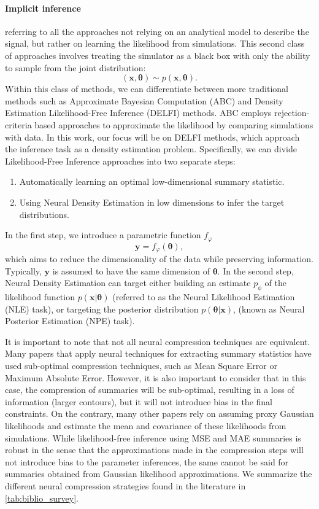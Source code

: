 \documentclass{aa}
\begin{document}
\paragraph{\textbf{Implicit inference}} referring to all the approaches not relying on an analytical model to describe the signal, but rather on learning the likelihood from simulations. This second class of approaches involves treating the simulator as a black box with only the ability to sample from the joint distribution:
\begin{equation}
    (\bm{x}, \bm{\theta})\sim p(\bm{x}, \bm{\theta}).
\end{equation}
Within this class of methods, we can differentiate between more traditional methods such as Approximate Bayesian Computation (ABC) and Density Estimation Likelihood-Free Inference (DELFI) methods. ABC employs rejection-criteria based approaches to approximate the likelihood by comparing simulations with data. 
In this work, our focus will be on DELFI methods, which approach the inference task as a density estimation problem. Specifically, we can divide Likelihood-Free Inference approaches into two separate steps:
\begin{enumerate}
    \item  Automatically learning an optimal low-dimensional summary statistic.
    \item Using Neural Density Estimation in low dimensions to infer the target distributions.
\end{enumerate}
In the first step, we introduce a parametric function $f_{\varphi}$
     \begin{equation}
         \bm{y}=f_{\varphi}(\bm{\theta}),
     \end{equation}
which aims to reduce the dimensionality of the data while preserving information. Typically, $\bm{y}$ is assumed to have the same dimension of $\bm{\theta}$. 
In the second step, Neural Density Estimation can target either building an estimate $p_{\phi}$ of the likelihood function $p(\bm{x}|\bm{\theta})$ (referred to as the Neural Likelihood Estimation (NLE) task), or targeting the posterior distribution $p(\bm{\theta}|\bm{x})$, (known as Neural Posterior Estimation (NPE) task). 

It is important to note that not all neural compression techniques are equivalent. Many papers that apply neural techniques for extracting summary statistics have used sub-optimal compression techniques, such as Mean Square Error or Maximum Absolute Error.
However, it is also important to consider that in this case, the compression of summaries will be sub-optimal, resulting in a loss of information (larger contours), but it will not introduce bias in the final constraints. On the contrary, many other papers rely on assuming proxy Gaussian likelihoods and estimate the mean and covariance of these likelihoods from simulations. While likelihood-free inference using MSE and MAE summaries is robust in the sense that the approximations made in the compression steps will not introduce bias to the parameter inferences, the same cannot be said for summaries obtained from Gaussian likelihood approximations.
We summarize the different neural compression strategies found in the literature in \autoref{tab:biblio_survey}.
\end{document}
